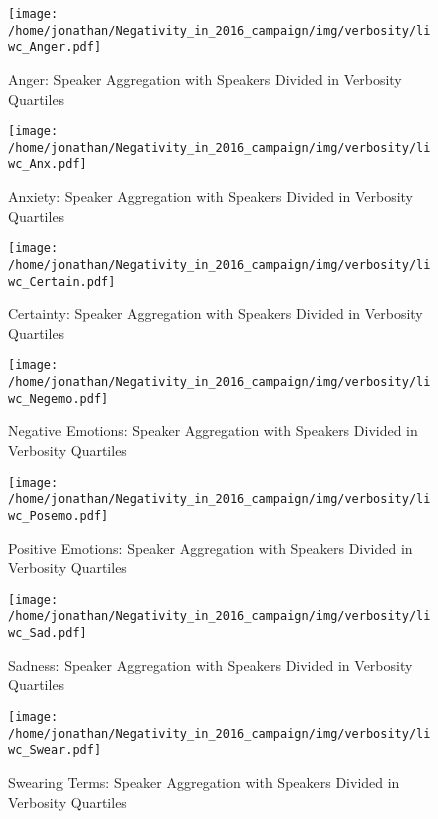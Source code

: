 \begin{figure}[h]\centering
\texttt{[image: /home/jonathan/Negativity\_in\_2016\_campaign/img/verbosity/liwc\_Anger.pdf]}
\caption{Anger: Speaker Aggregation with Speakers Divided in Verbosity Quartiles}
\label{fig: verbosity_Anger}
\end
{figure}

\begin{figure}[h]\centering
\texttt{[image: /home/jonathan/Negativity\_in\_2016\_campaign/img/verbosity/liwc\_Anx.pdf]}
\caption{Anxiety: Speaker Aggregation with Speakers Divided in Verbosity Quartiles}
\label{fig: verbosity_Anxiety}
\end
{figure}

\begin{figure}[h]\centering
\texttt{[image: /home/jonathan/Negativity\_in\_2016\_campaign/img/verbosity/liwc\_Certain.pdf]}
\caption{Certainty: Speaker Aggregation with Speakers Divided in Verbosity Quartiles}
\label{fig: verbosity_Certainty}
\end
{figure}

\begin{figure}[h]\centering
\texttt{[image: /home/jonathan/Negativity\_in\_2016\_campaign/img/verbosity/liwc\_Negemo.pdf]}
\caption{Negative Emotions: Speaker Aggregation with Speakers Divided in Verbosity Quartiles}
\label{fig: verbosity_Negative Emotions}
\end
{figure}

\begin{figure}[h]\centering
\texttt{[image: /home/jonathan/Negativity\_in\_2016\_campaign/img/verbosity/liwc\_Posemo.pdf]}
\caption{Positive Emotions: Speaker Aggregation with Speakers Divided in Verbosity Quartiles}
\label{fig: verbosity_Positive Emotions}
\end
{figure}

\begin{figure}[h]\centering
\texttt{[image: /home/jonathan/Negativity\_in\_2016\_campaign/img/verbosity/liwc\_Sad.pdf]}
\caption{Sadness: Speaker Aggregation with Speakers Divided in Verbosity Quartiles}
\label{fig: verbosity_Sadness}
\end
{figure}

\begin{figure}[h]\centering
\texttt{[image: /home/jonathan/Negativity\_in\_2016\_campaign/img/verbosity/liwc\_Swear.pdf]}
\caption{Swearing Terms: Speaker Aggregation with Speakers Divided in Verbosity Quartiles}
\label{fig: verbosity_Swearing Terms}
\end
{figure}

